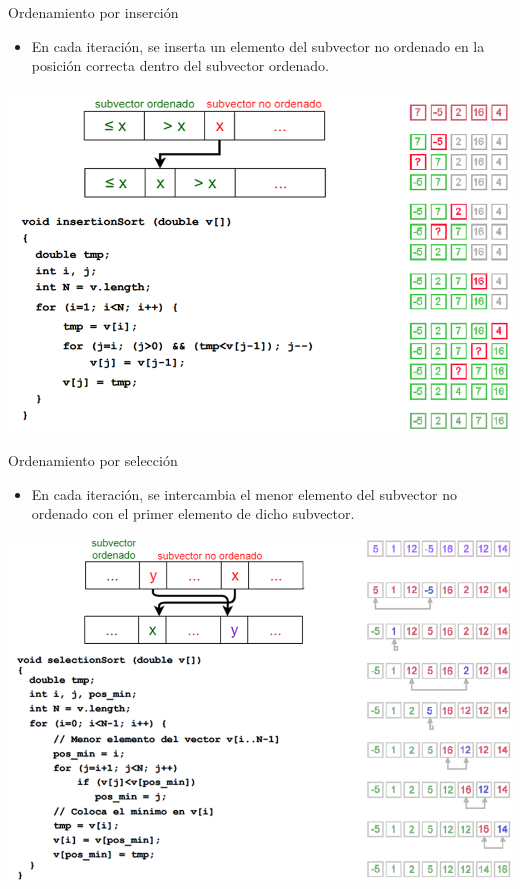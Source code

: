 \documentclass{beamer} %
\begin{document}
\begin{frame}{Ordenamiento por inserción}
    \begin{itemize}
        \item {\footnotesize En cada iteración, se inserta un elemento del subvector no ordenado en la posición correcta dentro del subvector ordenado.}
    \end{itemize}
    \begin{center}
        \includegraphics[width=.8\textwidth]{./image/cap5/insertion-sort.png}
    \end{center}
\end{frame}

\begin{frame}{Ordenamiento por selección}
    \begin{itemize}
        \item {\footnotesize En cada iteración, se intercambia el menor elemento del subvector no ordenado con el primer elemento de dicho subvector.}
    \end{itemize}
    \begin{center}
        \includegraphics[width=.8\textwidth]{./image/cap5/selection-sort.png}
    \end{center}
\end{frame}
\end{document}
